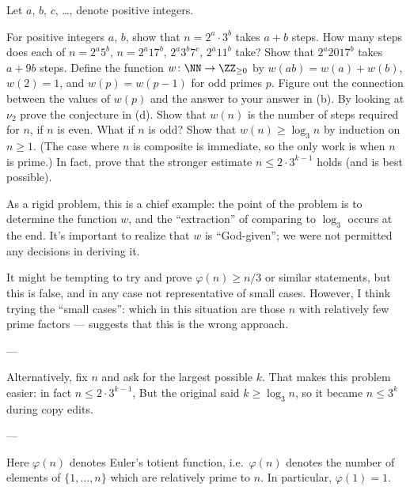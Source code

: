 Let $a$, $b$, $c$, \dots, denote positive integers.
\begin{walk}
  \ii For positive integers $a$, $b$,
  show that $n = 2^a \cdot 3^b$ takes $a+b$ steps.
  \ii How many steps does each of $n = 2^a 5^b$,
  $n = 2^a 17^b$, $2^a 3^b 7^c$, $2^a 11^b$ take?
  \ii Show that $2^a 2017^b$ takes $a+9b$ steps.
  \ii Define the function $w \colon \NN \to \ZZ_{\ge 0}$
  by $w(ab) = w(a) + w(b)$, $w(2)=1$,
  and $w(p) = w(p-1)$ for odd primes $p$.
  Figure out the connection between the values of $w(p)$
  and the answer to your answer in (b).
  \ii By looking at $\nu_2$ prove the conjecture in (d).
  \ii Show that $w(n)$ is the number of steps required for $n$,
  if $n$ is even. What if $n$ is odd?
  \ii Show that $w(n) \ge \log_3 n$ by induction on $n \ge 1$.
  (The case where $n$ is composite is immediate,
  so the only work is when $n$ is prime.)
  \ii In fact, prove that the stronger
  estimate $n \le 2 \cdot 3^{k-1}$ holds (and is best possible).
\end{walk}
As a rigid problem, this is a chief example:
the point of the problem is to determine the function $w$,
and the ``extraction'' of comparing to $\log_3$ occurs at the end.
It's important to realize that $w$ is ``God-given'';
we were not permitted any decisions in deriving it.

It might be tempting to try and prove $\varphi(n) \ge n/3$
or similar statements, but this is false,
and in any case not representative of small cases.
However, I think trying the ``small cases'':
which in this situation are those $n$ with relatively
few prime factors --- suggests that this is the wrong approach.


---

Alternatively, fix $n$ and ask for the largest possible $k$.
That makes this problem easier: in fact $n \le 2 \cdot 3^{k-1}$,
But the original said $k \ge \log_3 n$,
so it became $n \le 3^k$ during copy edits.

---

Here $\varphi(n)$ denotes Euler's totient function,
i.e.\ $\varphi(n)$ denotes the number of elements of $\{1, \dots, n\}$
which are relatively prime to $n$. In particular, $\varphi(1) = 1$.
